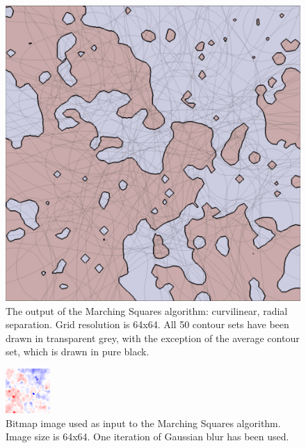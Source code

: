 \documentclass[12pt]{article}
\begin{document}
\begin{figure} 
\centering
  \includegraphics[width = 3 in]{no_blur.png}
  \caption{The output of the Marching Squares algorithm: curvilinear, radial separation. 
Grid resolution is 64x64.
All 50 contour sets have been drawn in transparent grey, with the exception of the average contour set, which is drawn in pure black.
}
\end{figure}





\begin{figure} 
\centering
  \includegraphics[width = 3 in]{image_avg_1blur.png}
  \caption{Bitmap image used as input to the Marching Squares algorithm.
Image size is 64x64.
One iteration of Gaussian blur has been used.
}
\end{figure}
\end{document}
